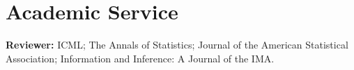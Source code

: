\documentclass[11pt,letterpaper]{article}
\begin{document}



\section*{Academic Service}
{\small
\textbf{Reviewer:} ICML; The Annals of Statistics; Journal of the American Statistical Association; Information and Inference: A Journal of the IMA.
}
\end{document}
